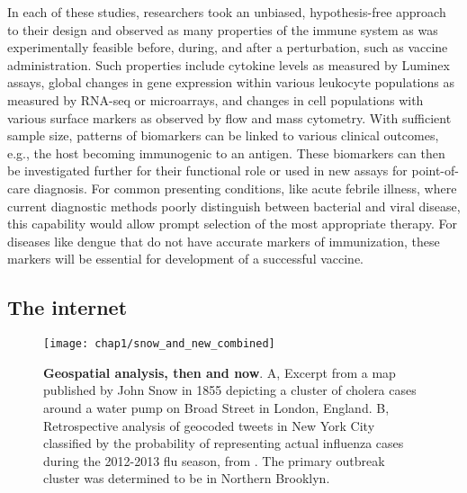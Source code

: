 In each of these studies, researchers took an unbiased, hypothesis-free approach to their design and observed as many properties of the immune system as was experimentally feasible before, during, and after a perturbation, such as vaccine administration. Such properties include cytokine levels as measured by Luminex assays, global changes in gene expression within various leukocyte populations as measured by RNA-seq or microarrays, and changes in cell populations with various surface markers as observed by flow and mass cytometry. With sufficient sample size, patterns of biomarkers can be linked to various clinical outcomes, e.g., the host becoming immunogenic to an antigen. These biomarkers can then be investigated further for their functional role or used in new assays for point-of-care diagnosis. For common presenting conditions, like acute febrile illness, where current diagnostic methods poorly distinguish between bacterial and viral disease, this capability would allow prompt selection of the most appropriate therapy.\autocite{Mejias2014} For diseases like dengue that do not have accurate markers of immunization, these markers will be essential for development of a successful vaccine.\autocite{Mahalingam2013}

\subsection{The internet}

\begin{figure}[htb]
  \texttt{[image: chap1/snow\_and\_new\_combined]}               
  \caption[Geospatial analysis, then and now]{\textbf{Geospatial analysis, then and now}. A, Excerpt from a map published by John Snow in 1855 depicting a cluster of cholera cases around a water pump on Broad Street in London, England. B, Retrospective analysis of geocoded tweets in New York City classified by the probability of representing actual influenza cases during the 2012-2013 flu season, from \textcite{Nagar2014}. The primary outbreak cluster was determined to be in Northern Brooklyn.}
  \label{fig:snow_and_new_combined}
\end{figure}

